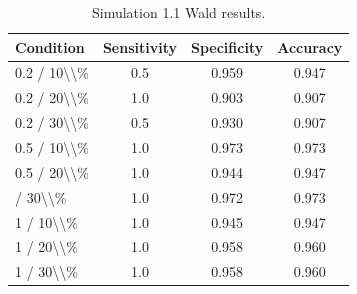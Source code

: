 \begin{table}[!h]
\centering
\caption{\label{tab:tab:sim11_wald}Simulation 1.1 Wald results.}
\centering
\begin{tabular}[t]{lccc}
\toprule
Condition & Sensitivity & Specificity & Accuracy\\
\midrule
0.2 / 10\textbackslash{}\textbackslash{}\% & 0.5 & 0.959 & 0.947\\
0.2 / 20\textbackslash{}\textbackslash{}\% & 1.0 & 0.903 & 0.907\\
0.2 / 30\textbackslash{}\textbackslash{}\% & 0.5 & 0.930 & 0.907\\
0.5 / 10\textbackslash{}\textbackslash{}\% & 1.0 & 0.973 & 0.973\\
0.5 / 20\textbackslash{}\textbackslash{}\% & 1.0 & 0.944 & 0.947\\
\addlinespace
0.5 / 30\textbackslash{}\textbackslash{}\% & 1.0 & 0.972 & 0.973\\
1 / 10\textbackslash{}\textbackslash{}\% & 1.0 & 0.945 & 0.947\\
1 / 20\textbackslash{}\textbackslash{}\% & 1.0 & 0.958 & 0.960\\
1 / 30\textbackslash{}\textbackslash{}\% & 1.0 & 0.958 & 0.960\\
\bottomrule
\end{tabular}
\end{table}

